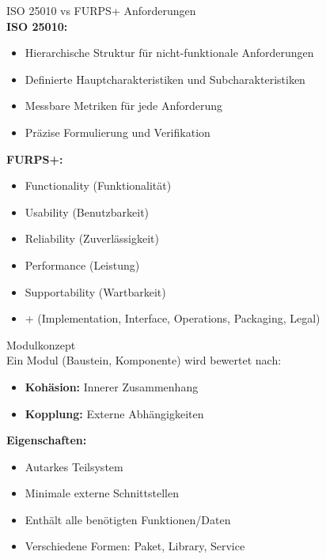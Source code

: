 \begin{theorem}{ISO 25010 vs FURPS+ Anforderungen}\\
\textbf{ISO 25010:}
\begin{itemize}
    \item Hierarchische Struktur für nicht-funktionale Anforderungen
    \item Definierte Hauptcharakteristiken und Subcharakteristiken
    \item Messbare Metriken für jede Anforderung
    \item Präzise Formulierung und Verifikation
\end{itemize}

\textbf{FURPS+:}
\begin{itemize}
    \item Functionality (Funktionalität)
    \item Usability (Benutzbarkeit)
    \item Reliability (Zuverlässigkeit)
    \item Performance (Leistung)
    \item Supportability (Wartbarkeit)
    \item + (Implementation, Interface, Operations, Packaging, Legal)
\end{itemize}
\end{theorem}

\begin{concept}{Modulkonzept}\\
Ein Modul (Baustein, Komponente) wird bewertet nach:
\begin{itemize}
    \item \textbf{Kohäsion:} Innerer Zusammenhang
    \item \textbf{Kopplung:} Externe Abhängigkeiten
\end{itemize}

\textbf{Eigenschaften:}
\begin{itemize}
    \item Autarkes Teilsystem
    \item Minimale externe Schnittstellen
    \item Enthält alle benötigten Funktionen/Daten
    \item Verschiedene Formen: Paket, Library, Service
\end{itemize}
\end{concept}

